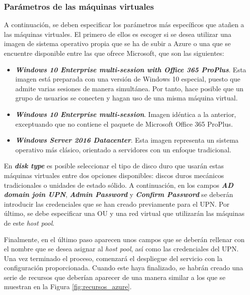 \subsubsection{Parámetros de las máquinas virtuales}
A continuación, se deben especificar los parámetros más específicos que atañen a las máquinas virtuales. El primero de ellos es escoger si se desea utilizar una imagen de sistema operativo propia que se ha de subir a Azure o una que se encuentre disponible entre las que ofrece Microsoft, que son las siguientes:

\begin{itemize}
    \item \textbf{\textit{Windows 10 Enterprise multi-session with Office 365 ProPlus}}. Esta imagen está preparada con una versión de Windows 10 especial, puesto que admite varias sesiones de manera simultánea. Por tanto, hace posible que un grupo de usuarios se conecten y hagan uso de una misma máquina virtual.
    
    \item \textbf{\textit{Windows 10 Enterprise multi-session}}. Imagen idéntica a la anterior, exceptuando que no contiene el paquete de Microsoft Office 365 ProPlus.
    
    \item \textbf{\textit{Windows Server 2016 Datacenter}}. Esta imagen representa un sistema operativo más clásico, orientado a servidores con un enfoque tradicional.
\end{itemize}

En \textbf{\textit{disk type}} es posible seleccionar el tipo de disco duro que usarán estas máquinas virtuales entre dos opciones disponibles: discos duros mecánicos tradicionales o unidades de estado sólido. A continuación, en los campos \textbf{\textit{AD domain join UPN}}, \textbf{\textit{Admin Password}} y \textbf{\textit{Confirm Password}} se deberán introducir las credenciales que se han creado previamente para el \acf{UPN}. Por último, se debe especificar una \acf{OU} y una red virtual que utilizarán las máquinas de este \textit{host pool}.

Finalmente, en el último paso aparecen unos campos que se deberán rellenar con el nombre que se desea asignar al \textit{host pool}, así como las credenciales del \acs{UPN}. Una vez terminado el proceso, comenzará el despliegue del servicio con la configuración proporcionada. Cuando este haya finalizado, se habrán creado una serie de recursos que deberían aparecer de una manera similar a los que se muestran en la Figura \ref{fig:recursos_azure}.

